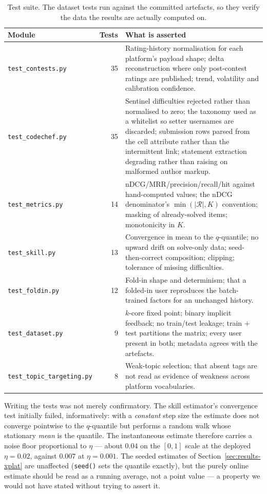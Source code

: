 \documentclass[12pt,a4paper]{article}
\newcommand{\ndcg}{nDCG}
\begin{document}
\begin{table}[h]
\centering
\caption{Test suite. The dataset tests run against the committed artefacts, so they
verify the data the results are actually computed on.}
\label{tab:tests}
\small
\begin{tabularx}{\textwidth}{@{}lrX@{}}
\toprule
\textbf{Module} & \textbf{Tests} & \textbf{What is asserted} \\
\midrule
\texttt{test\_contests.py} & 35 & Rating-history normalisation for each platform's
payload shape; delta reconstruction where only post-contest ratings are published;
trend, volatility and calibration confidence. \\
\texttt{test\_codechef.py} & 35 & Sentinel difficulties rejected rather than normalised
to zero; the taxonomy used as a whitelist so setter usernames are discarded; submission
rows parsed from the cell attribute rather than the intermittent link; statement
extraction degrading rather than raising on malformed author markup. \\
\texttt{test\_metrics.py} & 14 & \ndcg{}/MRR/precision/recall/hit against hand-computed
values; the \ndcg{} denominator's $\min(|\mathcal{R}|,K)$ convention; masking of
already-solved items; monotonicity in $K$. \\
\texttt{test\_skill.py} & 13 & Convergence in mean to the $q$-quantile; no upward drift
on solve-only data; seed-then-correct composition; clipping; tolerance of missing
difficulties. \\
\texttt{test\_foldin.py} & 12 & Fold-in shape and determinism; that a folded-in user
reproduces the batch-trained factors for an unchanged history. \\
\texttt{test\_dataset.py} & 9 & $k$-core fixed point; binary implicit feedback; no
train/test leakage; train $+$ test partitions the matrix; every user present in both;
metadata agrees with the artefacts. \\
\texttt{test\_topic\_targeting.py} & 8 & Weak-topic selection; that absent tags are not
read as evidence of weakness across platform vocabularies. \\
\bottomrule
\end{tabularx}
\end{table}

Writing the tests was not merely confirmatory. The skill estimator's convergence test
initially failed, informatively: with a \emph{constant} step size the estimate does not
converge pointwise to the $q$-quantile but performs a random walk whose stationary
\emph{mean} is the quantile. The instantaneous estimate therefore carries a noise floor
proportional to $\eta$ --- about $0.04$ on the $[0,1]$ scale at the deployed $\eta=0.02$,
against $0.007$ at $\eta=0.001$. The seeded estimates of Section~\ref{sec:results-xplat}
are unaffected (\texttt{seed()} sets the quantile exactly), but the purely online
estimate should be read as a running average, not a point value --- a property we would
not have stated without trying to assert it.
\end{document}
